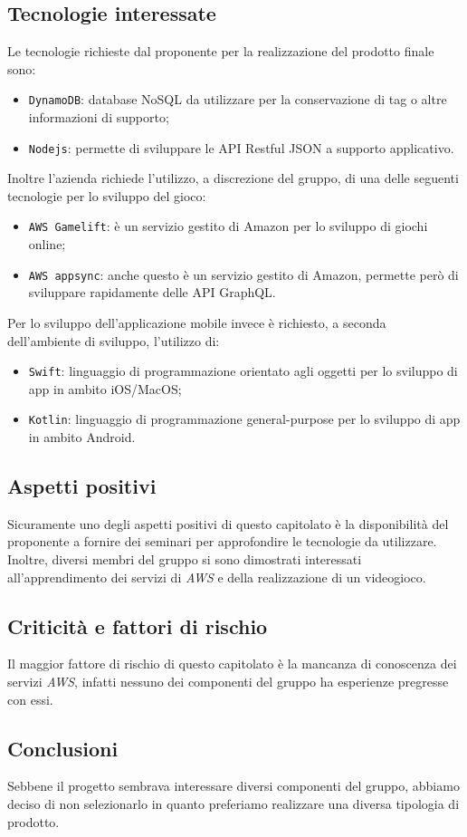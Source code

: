 \subsection{Tecnologie interessate}
Le tecnologie richieste dal proponente per la realizzazione del prodotto finale sono:
\begin{itemize}
	\item \verb|DynamoDB|: database NoSQL da utilizzare per la conservazione di tag o altre informazioni di supporto;
	\item \verb|Nodejs|: permette di sviluppare le API Restful JSON a supporto applicativo.
\end{itemize}
Inoltre l'azienda richiede l'utilizzo, a discrezione del gruppo, di una delle seguenti tecnologie per lo sviluppo del gioco:
\begin{itemize}
	\item \verb|AWS Gamelift|: è un servizio gestito di Amazon per lo sviluppo di giochi online;
	\item \verb|AWS appsync|: anche questo è un servizio gestito di Amazon, permette però di sviluppare rapidamente delle API GraphQL.
\end{itemize}
Per lo sviluppo dell'applicazione mobile invece è richiesto, a seconda dell'ambiente di sviluppo, l'utilizzo di:
\begin{itemize}
	\item \verb|Swift|: linguaggio di programmazione orientato agli oggetti per lo sviluppo di app in ambito iOS/MacOS;
	\item \verb|Kotlin|: linguaggio di programmazione general-purpose per lo sviluppo di app in ambito Android.
\end{itemize}


\subsection{Aspetti positivi}
Sicuramente uno degli aspetti positivi di questo capitolato è la disponibilità del proponente a fornire dei seminari per approfondire le tecnologie da utilizzare.
Inoltre, diversi membri del gruppo si sono dimostrati interessati all'apprendimento dei servizi di \textit{AWS} e della realizzazione di un videogioco.


\subsection{Criticità e fattori di rischio}
Il maggior fattore di rischio di questo capitolato è la mancanza di conoscenza dei servizi \textit{AWS}, infatti nessuno dei componenti del gruppo ha esperienze pregresse con essi.


\subsection{Conclusioni}
Sebbene il progetto sembrava interessare diversi componenti del gruppo, abbiamo deciso di non selezionarlo in quanto preferiamo realizzare una diversa tipologia di prodotto.
\newpage
